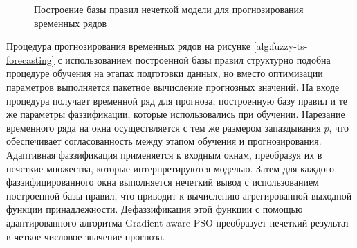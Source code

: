 \begin{figure}[h]
	\label{alg:fuzzy-ts-training}
	\caption{Построение базы правил нечеткой модели для прогнозирования временных рядов}
\end{figure}

Процедура прогнозирования временных рядов на рисунке \cref{alg:fuzzy-ts-forecasting} с использованием построенной базы правил структурно подобна процедуре обучения на этапах подготовки данных, но вместо оптимизации параметров выполняется пакетное вычисление прогнозных значений. На входе процедура получает временной ряд для прогноза, построенную базу правил и те же параметры фаззификации, которые использовались при обучении. Нарезание временного ряда на окна осуществляется с тем же размером запаздывания $p$, что обеспечивает согласованность между этапом обучения и прогнозирования. Адаптивная фаззификация применяется к входным окнам, преобразуя их в нечеткие множества, которые интерпретируются моделью. Затем для каждого фаззифицированного окна выполняется нечеткий вывод с использованием построенной базы правил, что приводит к вычислению агрегированной выходной функции принадлежности. Дефаззификация этой функции с помощью адаптированного алгоритма Gradient-aware PSO преобразует нечеткий результат в четкое числовое значение прогноза.

